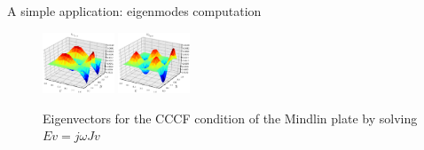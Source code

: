 \documentclass[aspectratio=169]{ISAE-Beamer}
\begin{document}
\begin{frame}{A simple application: eigenmodes computation}
\begin{figure}
	\includegraphics[width=0.19\textwidth]{EigenvectorsM/Eig_9.eps} 
	\includegraphics[width=0.19\textwidth]{EigenvectorsM/Eig_10.eps}  
	\caption{Eigenvectors for the CCCF condition of the Mindlin plate by solving $Ev = j\omega Jv$}
\end{figure}
\end{frame}
\end{document}
